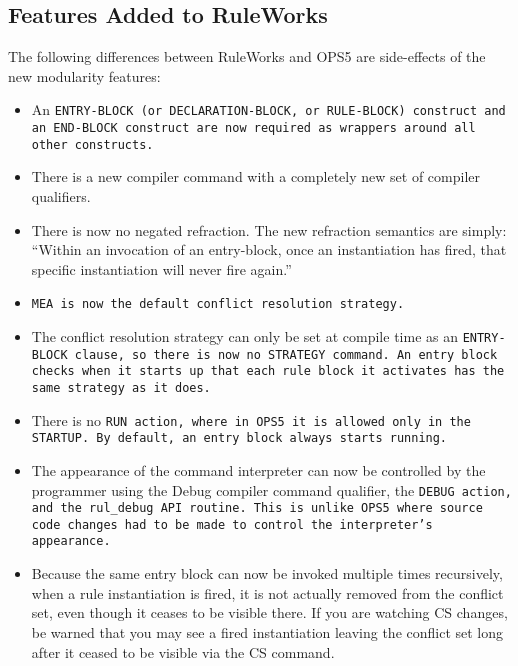 \subsection{Features Added to RuleWorks}

The following differences between RuleWorks and OPS5 are side-effects
of the new modularity features:
\begin{itemize}
\item An \tt{ENTRY-BLOCK} (or \tt{DECLARATION-BLOCK}, or
  \tt{RULE-BLOCK}) construct and an \tt{END-BLOCK} construct are now
  required as wrappers around all other constructs.

\item There is a new compiler command with a completely new set of
  compiler qualifiers.

\item There is now no negated refraction.  The new refraction
  semantics are simply: ``Within an invocation of an entry-block, once
  an instantiation has fired, that specific instantiation will never
  fire again.''

\item \tt{MEA} is now the default conflict resolution strategy.

\item The conflict resolution strategy can only be set at compile time
  as an \tt{ENTRY-BLOCK} clause, so there is now no \tt{STRATEGY}
  command. An entry block checks when it starts up that each rule
  block it activates has the same strategy as it does.

\item There is no \tt{RUN} action, where in OPS5 it is allowed only in
  the \tt{STARTUP}. By default, an entry block always starts running.

\item The appearance of the command interpreter can now be controlled
  by the programmer using the Debug compiler command qualifier, the
  \tt{DEBUG} action, and the \verb|rul_debug| API routine. This is
  unlike OPS5 where source code changes had to be made to control the
  interpreter's appearance.

\item Because the same entry block can now be invoked multiple times
  recursively, when a rule instantiation is fired, it is not actually
  removed from the conflict set, even though it ceases to be visible
  there. If you are watching CS changes, be warned that you may see a
  fired instantiation leaving the conflict set long after it ceased to
  be visible via the CS command.


\end{itemize}
